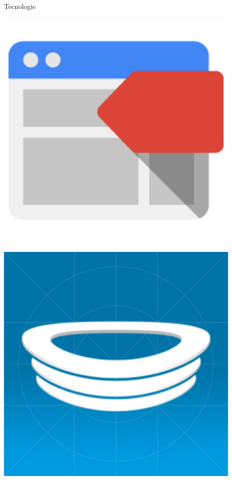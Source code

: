 \begin{frame}{Tecnologie}
\begin{minipage}{\textwidth}
\begin{minipage}{0.24\textwidth}
\begin{minipage}{0.48\textwidth}
					\end{minipage}\par
					\vspace{0.02\textwidth}
					\begin{minipage}{0.48\textwidth}
						\begin{flushright}
							\includegraphics[width=0.9\textwidth]{capitolo_2/immagini/google_tag_manager.png}
						\end{flushright}
					\end{minipage}
					\begin{minipage}{0.48\textwidth}
						\includegraphics[width=0.9\textwidth]{capitolo_2/immagini/hockeyapp.png}
					\end{minipage}
				\end{minipage}
			\end{minipage}
		\end{frame}
